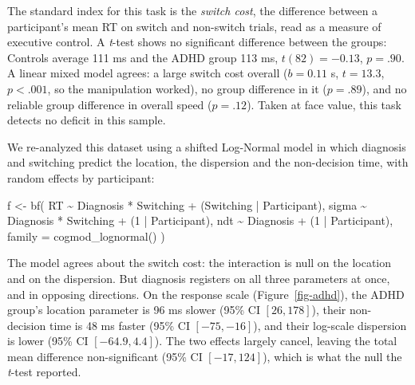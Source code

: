 \documentclass[
  jou,
  floatsintext,
  longtable,
  nolmodern,
  notxfonts,
  notimes,
  12pt,
  colorlinks=true,linkcolor=blue,citecolor=blue,urlcolor=blue]{apa7}
\newenvironment{Shaded}{\begin{snugshade}}{\end{snugshade}}
\newcommand{\AttributeTok}[1]{\textcolor[rgb]{0.40,0.45,0.13}{#1}}
\newcommand{\DecValTok}[1]{\textcolor[rgb]{0.68,0.00,0.00}{#1}}
\newcommand{\FunctionTok}[1]{\textcolor[rgb]{0.28,0.35,0.67}{#1}}
\newcommand{\NormalTok}[1]{\textcolor[rgb]{0.00,0.23,0.31}{#1}}
\newcommand{\OtherTok}[1]{\textcolor[rgb]{0.00,0.23,0.31}{#1}}
\newcommand{\SpecialCharTok}[1]{\textcolor[rgb]{0.37,0.37,0.37}{#1}}
\begin{document}
The standard index for this task is the \emph{switch cost}, the
difference between a participant's mean RT on switch and non-switch
trials, read as a measure of executive control. A \emph{t}-test shows no
significant difference between the groups: Controls average 111 ms and
the ADHD group 113 ms, \(t(82) = -0.13\), \(p = .90\). A linear mixed
model agrees: a large switch cost overall (\(b = 0.11\) s, \(t = 13.3\),
\(p < .001\), so the manipulation worked), no group difference in it
(\(p = .89\)), and no reliable group difference in overall speed
(\(p = .12\)). Taken at face value, this task detects no deficit in this
sample.

We re-analyzed this dataset using a shifted Log-Normal model in which
diagnosis and switching predict the location, the dispersion and the
non-decision time, with random effects by participant:

\begin{Shaded}
\begin{Highlighting}[]
\NormalTok{f }\OtherTok{\textless{}{-}} \FunctionTok{bf}\NormalTok{(}
\NormalTok{  RT }\SpecialCharTok{\textasciitilde{}}\NormalTok{ Diagnosis }\SpecialCharTok{*}\NormalTok{ Switching }\SpecialCharTok{+}
\NormalTok{    (Switching }\SpecialCharTok{|}\NormalTok{ Participant),}
\NormalTok{  sigma }\SpecialCharTok{\textasciitilde{}}\NormalTok{ Diagnosis }\SpecialCharTok{*}\NormalTok{ Switching }\SpecialCharTok{+}
\NormalTok{    (}\DecValTok{1} \SpecialCharTok{|}\NormalTok{ Participant),}
\NormalTok{  ndt }\SpecialCharTok{\textasciitilde{}}\NormalTok{ Diagnosis }\SpecialCharTok{+}\NormalTok{ (}\DecValTok{1} \SpecialCharTok{|}\NormalTok{ Participant),}
  \AttributeTok{family =} \FunctionTok{cogmod\_lognormal}\NormalTok{()}
\NormalTok{)}
\end{Highlighting}
\end{Shaded}

The model agrees about the switch cost: the interaction is null on the
location and on the dispersion. But diagnosis registers on all three
parameters at once, and in opposing directions. On the response scale
(Figure~\ref{fig-adhd}), the ADHD group's location parameter is 96 ms
slower (95\% CI \([26, 178]\)), their non-decision time is 48 ms faster
(95\% CI \([-75, -16]\)), and their log-scale dispersion is lower (95\%
CI \([-64.9, 4.4]\)). The two effects largely cancel, leaving the total
mean difference non-significant (95\% CI \([-17, 124]\)), which is what
the null the \emph{t}-test reported.
\end{document}
